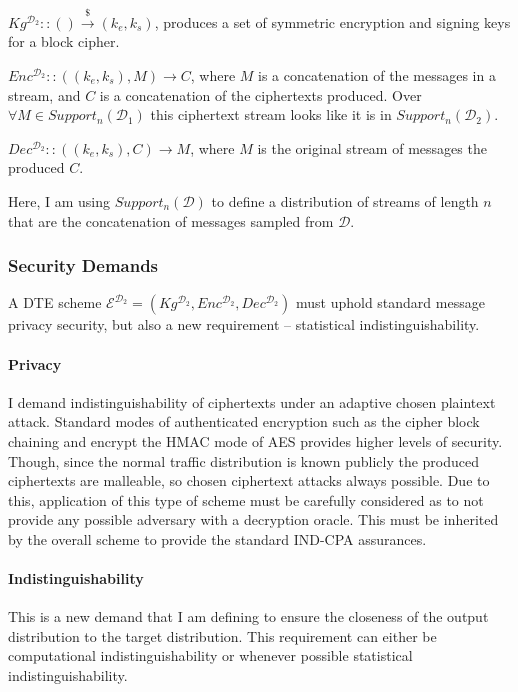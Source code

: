 \documentclass[ %
                    author={Samuel Russell},
                supervisor={Prof. Bogdan Warinschi},
                    degree={MEng},
                     title={Innocuous Ciphertexts},
                  subtitle={The DE-CENSOR Scheme},
                      type={research},
                      year={2018} ]{dissertation}
\begin{document}
$Kg^{\mathcal{D}_2} :: () \xrightarrow{\$} (k_e,k_s)$, produces a set of symmetric encryption and signing keys for a block cipher.

$Enc^{\mathcal{D}_2} :: ((k_e,k_s), M) \rightarrow C$, where $M$ is a concatenation of the messages in a stream, and $C$ is a concatenation of the ciphertexts produced. Over $\forall M \in Support_n(\mathcal{D}_1)$ this ciphertext stream looks like it is in  $Support_n(\mathcal{D}_2)$.

$Dec^{\mathcal{D}_2} :: ((k_e,k_s), C) \rightarrow M$, where $M$ is the original stream of messages the produced $C$.

Here, I am using $Support_n(\mathcal{D})$ to define a distribution of streams of length $n$ that are the concatenation of messages sampled from $\mathcal{D}$.

\subsubsection{Security Demands}

A DTE scheme $\mathcal{E}^{\mathcal{D}_2} = (Kg^{\mathcal{D}_2}, Enc^{\mathcal{D}_2}, Dec^{\mathcal{D}_2})$ must uphold standard message privacy security, but also a new requirement -- statistical indistinguishability.

\paragraph{Privacy}

I demand indistinguishability of ciphertexts under an adaptive chosen plaintext attack. Standard modes of authenticated encryption such as the cipher block chaining and encrypt the HMAC mode of AES provides higher levels of security.
Though, since the normal traffic distribution is known publicly the produced ciphertexts are malleable, so chosen ciphertext attacks always possible.
Due to this, application of this type of scheme must be carefully considered as to not provide any possible adversary with a decryption oracle.
This must be inherited by the overall scheme to provide the standard IND-CPA assurances.

\paragraph{Indistinguishability}

This is a new demand that I am defining to ensure the closeness of the output distribution to the target distribution.
This requirement can either be computational indistinguishability or whenever possible statistical indistinguishability.
\end{document}
